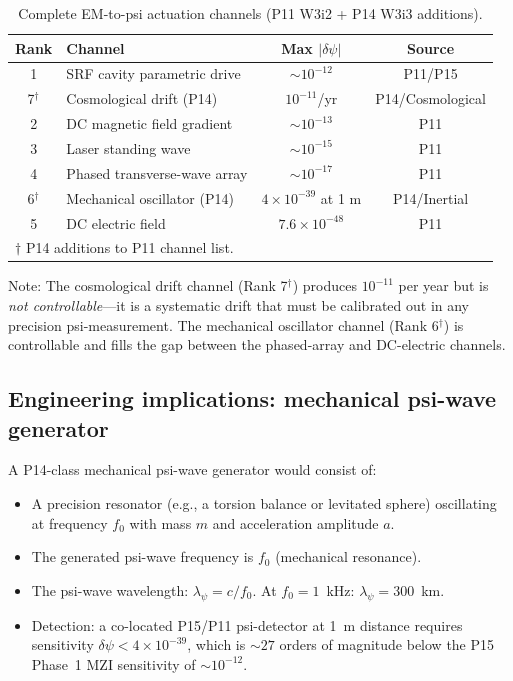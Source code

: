 \documentclass[11pt]{article}
\newcommand{\ee}[1]{\times 10^{#1}}
\begin{document}
\begin{table}[h]
\centering
\caption{Complete EM-to-psi actuation channels (P11 W3i2 + P14 W3i3 additions).}
\label{tab:channels}
\begin{tabular}{clcc}
\toprule
Rank & Channel & Max $|\delta\psi|$ & Source \\
\midrule
1 & SRF cavity parametric drive & $\sim 10^{-12}$ & P11/P15 \\
7$^\dagger$ & Cosmological drift (P14) & $10^{-11}$/yr & P14/Cosmological \\
2 & DC magnetic field gradient & $\sim 10^{-13}$ & P11 \\
3 & Laser standing wave & $\sim 10^{-15}$ & P11 \\
4 & Phased transverse-wave array & $\sim 10^{-17}$ & P11 \\
6$^\dagger$ & Mechanical oscillator (P14) & $4\ee{-39}$ at 1 m & P14/Inertial \\
5 & DC electric field & $7.6\ee{-48}$ & P11 \\
\bottomrule
\multicolumn{4}{l}{$\dagger$ P14 additions to P11 channel list.}
\end{tabular}
\end{table}

\noindent Note: The cosmological drift channel (Rank 7$^\dagger$) produces
$10^{-11}$ per year but is \emph{not controllable}---it is a systematic
drift that must be calibrated out in any precision psi-measurement.
The mechanical oscillator channel (Rank 6$^\dagger$) is controllable and
fills the gap between the phased-array and DC-electric channels.

\subsection{Engineering implications: mechanical psi-wave generator}

A P14-class mechanical psi-wave generator would consist of:
\begin{itemize}
\item A precision resonator (e.g., a torsion balance or levitated sphere)
  oscillating at frequency $f_0$ with mass $m$ and acceleration amplitude $a$.
\item The generated psi-wave frequency is $f_0$ (mechanical resonance).
\item The psi-wave wavelength: $\lambda_\psi = c/f_0$.
  At $f_0 = 1$~kHz: $\lambda_\psi = 300$~km.
\item Detection: a co-located P15/P11 psi-detector at 1~m distance
  requires sensitivity $\delta\psi < 4\ee{-39}$, which is $\sim 27$ orders
  of magnitude below the P15 Phase~1 MZI sensitivity of $\sim 10^{-12}$.
\end{itemize}
\end{document}
